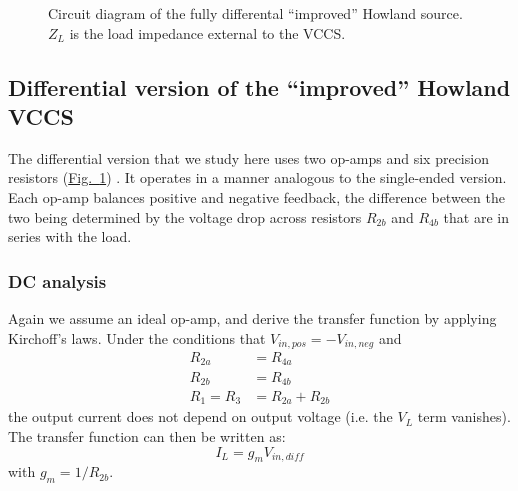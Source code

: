 \documentclass[conference]{IEEEtran}
\newcommand{\brieffiglink}[1]{\hyperref[#1]{Fig.~\ref*{#1}}}
\begin{document}
\begin{figure}[tb]
\vspace{-1.5cm}\hspace{-4.6cm}\makebox[\textwidth][c]{%
\scalebox{.75}{%

}}
\caption{\small Circuit diagram of the fully differental ``improved'' Howland source. $Z_L$ is the load impedance external to the VCCS.}
\label{fig:differential_howland}
\end{figure}




\subsection{Differential version of the ``improved'' Howland VCCS}
\label{sec:differential_howland}

The differential version that we study here uses two op-amps and six precision resistors (\brieffiglink{fig:differential_howland}) \cite{simmonds2009differential}. It operates in a manner analogous to the single-ended version. Each op-amp balances positive and negative feedback, the difference between the two being determined by the voltage drop across resistors $R_{2b}$ and $R_{4b}$ that are in series with the load.

\subsubsection{DC analysis}

Again we assume an ideal op-amp, and derive the transfer function by applying Kirchoff's laws. Under the conditions that $V_{in,pos} = -V_{in,neg}$ and
\begin{subequations}
\label{eq:diff_howland_conditions}
\begin{align}
R_{2a} &= R_{4a}\\
R_{2b} &= R_{4b}\\
R_1 = R_3 &= R_{2a} + R_{2b}
\end{align}
\end{subequations}
the output current does not depend on output voltage (i.e. the $V_L$ term vanishes). The transfer function can then be written as:
\begin{equation}
\label{eq:diff_gain}
I_L = g_m V_{in,dif\!f}
\end{equation}
with $g_m = 1/R_{2b}$.
\end{document}
